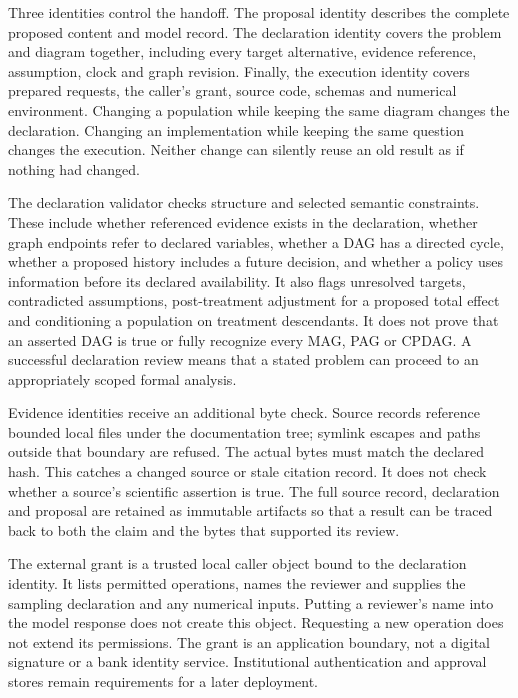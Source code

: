 Three identities control the handoff. The proposal identity describes the
complete proposed content and model record. The declaration identity covers the
problem and diagram together, including every target alternative, evidence
reference, assumption, clock and graph revision. Finally, the execution identity
covers prepared requests, the caller's grant, source code, schemas and numerical
environment. Changing a population while keeping the same diagram changes the
declaration. Changing an implementation while keeping the same question changes
the execution. Neither change can silently reuse an old result as if nothing
had changed.

The declaration validator checks structure and selected semantic constraints.
These include whether referenced evidence exists in the declaration, whether
graph endpoints refer to declared variables, whether a DAG has a directed cycle,
whether a proposed history includes a future decision, and whether a policy
uses information before its declared availability. It also flags unresolved
targets, contradicted assumptions, post-treatment adjustment for a proposed
total effect and conditioning a population on treatment descendants. It does
not prove that an asserted DAG is true or fully recognize every MAG, PAG or
CPDAG. A successful declaration review means that a stated problem can proceed
to an appropriately scoped formal analysis.

Evidence identities receive an additional byte check. Source records reference
bounded local files under the documentation tree; symlink escapes and paths
outside that boundary are refused. The actual bytes must match the declared
hash. This catches a changed source or stale citation record. It does not check
whether a source's scientific assertion is true. The full source record,
declaration and proposal are retained as immutable artifacts so that a result
can be traced back to both the claim and the bytes that supported its review.

The external grant is a trusted local caller object bound to the declaration
identity. It lists permitted operations, names the reviewer and supplies the
sampling declaration and any numerical inputs. Putting a reviewer's name into
the model response does not create this object. Requesting a new operation does
not extend its permissions. The grant is an application boundary, not a digital
signature or a bank identity service. Institutional authentication and approval
stores remain requirements for a later deployment.

